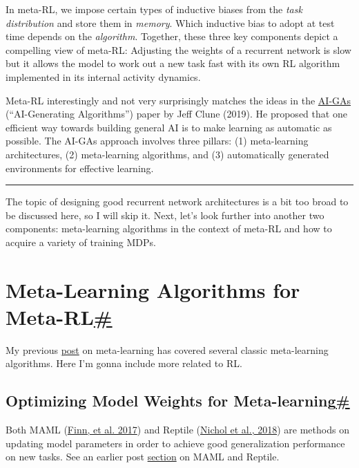 In meta-RL, we impose certain types of inductive biases from the \emph{task distribution} and store them in \emph{memory}. Which inductive bias to adopt at test time depends on the \emph{algorithm}. Together, these three key components depict a compelling view of meta-RL: Adjusting the weights of a recurrent network is slow but it allows the model to work out a new task fast with its own RL algorithm implemented in its internal activity dynamics.

Meta-RL interestingly and not very surprisingly matches the ideas in the \href{https://arxiv.org/abs/1905.10985}{AI-GAs} (``AI-Generating Algorithms'') paper by Jeff Clune (2019). He proposed that one efficient way towards building general AI is to make learning as automatic as possible. The AI-GAs approach involves three pillars: (1) meta-learning architectures, (2) meta-learning algorithms, and (3) automatically generated environments for effective learning.

\begin{center}\rule{0.5\linewidth}{0.5pt}\end{center}

The topic of designing good recurrent network architectures is a bit too broad to be discussed here, so I will skip it. Next, let's look further into another two components: meta-learning algorithms in the context of meta-RL and how to acquire a variety of training MDPs.

\section{\texorpdfstring{Meta-Learning Algorithms for Meta-RL\hyperref[meta-learning-algorithms-for-meta-rl]{\#}}{Meta-Learning Algorithms for Meta-RL\#}}\label{meta-learning-algorithms-for-meta-rl}

My previous \href{https://lilianweng.github.io/posts/2018-11-30-meta-learning/}{post} on meta-learning has covered several classic meta-learning algorithms. Here I'm gonna include more related to RL.

\subsection{\texorpdfstring{Optimizing Model Weights for Meta-learning\hyperref[optimizing-model-weights-for-meta-learning]{\#}}{Optimizing Model Weights for Meta-learning\#}}\label{optimizing-model-weights-for-meta-learning}

Both MAML (\href{https://arxiv.org/abs/1703.03400}{Finn, et al. 2017}) and Reptile (\href{https://arxiv.org/abs/1803.02999}{Nichol et al., 2018}) are methods on updating model parameters in order to achieve good generalization performance on new tasks. See an earlier post \href{https://lilianweng.github.io/posts/2018-11-30-meta-learning/\#optimization-based}{section} on MAML and Reptile.


